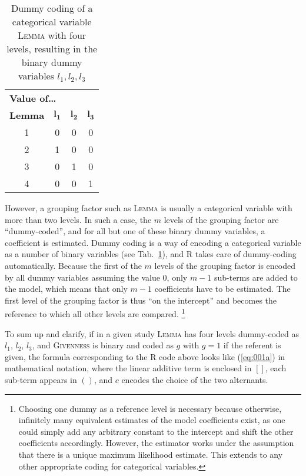 \begin{table}
  \centering
  \caption{Dummy coding of a categorical variable \textsc{Lemma} with four levels, resulting in the binary dummy variables $l_1,l_2,l_3$}
  \begin{tabular}{cccc}
    \toprule
    \multicolumn{4}{l}{\textbf{Value of\ldots}} \\
    \textbf{Lemma} & $\mathbf{l_1}$ & $\mathbf{l_2}$ & $\mathbf{l_3}$ \\
    \midrule
    1 & 0 & 0 & 0 \\ 
    2 & 1 & 0 & 0 \\ 
    3 & 0 & 1 & 0 \\ 
    4 & 0 & 0 & 1 \\ 
    \bottomrule
  \end{tabular}
  \label{tab:dummy}
\end{table}

However, a grouping factor such as \textsc{Lemma} is usually a categorical variable with more than two levels.
In such a case, the $m$ levels of the grouping factor are ``dummy-coded'', and for all but one of these binary dummy variables, a coefficient is estimated.
Dummy coding is a way of encoding a categorical variable as a number of binary variables (see Tab.~\ref{tab:dummy}), and R takes care of dummy-coding automatically.
Because the first of the $m$ levels of the grouping factor is encoded by all dummy variables assuming the value 0, only $m-1$ sub-terms are added to the model, which means that only $m-1$ coefficients have to be estimated.
The first level of the grouping factor is thus ``on the intercept'' and becomes the reference to which all other levels are compared.%
\footnote{Choosing one dummy as a reference level is necessary because otherwise, infinitely many equivalent estimates of the model coefficients exist, as one could simply add any arbitrary constant to the intercept and shift the other coefficients accordingly.
However, the estimator works under the assumption that there is a unique maximum likelihood estimate.
This extends to any other appropriate coding for categorical variables.
}

To sum up and clarify, if in a given study \textsc{Lemma} has four levels dummy-coded as $l_1$, $l_2$, $l_3$, and \textsc{Givenness} is binary and coded as $g$ with $g=1$ if the referent is given, the formula corresponding to the R code above looks like (\ref{eq:001a}) in mathematical notation, where the linear additive term is enclosed in $[ ]$, each sub-term appears in $( )$, and $c$ encodes the choice of the two alternants.

